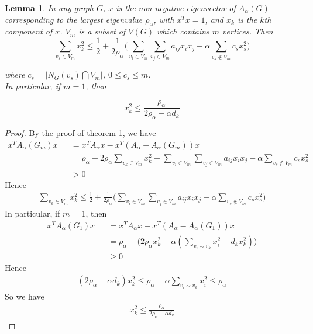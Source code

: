 \documentclass[amsthm]{elsart}
\newtheorem{lemma}{Lemma}[section]
\begin{document}
\begin{lemma}
In any graph $G$, $x$ is the non-negative eigenvector of $A_\alpha (G)$ corresponding to the largest eigenvalue $\rho _\alpha$, with $x^T x = 1$, and $x_k$ is the $k$th component of $x$. $V_m$ is a subset
of $V(G)$ which contains $m$ vertices. Then
\begin{equation} \label{equ:11}
\sum \limits_{v_k \in V_m}^{} x_k^2
\leqslant \frac{1}{2} + \frac{1}{2 \rho_\alpha} \Big( \sum \limits_{v_i \in V_m}^{} \sum \limits_{v_j \in V_m}^{} a_{ij} x_i x_j - \alpha \sum \limits_{v_s \notin V_m}^{} c_s x_s^2 \Big)
\end{equation}

where $ c_s = |N_G(v_s) \bigcap V_m|$,  $0\leqslant c_s \leqslant m$.
\\ In particular, if $m = 1$, then 

\begin{equation} \label{equ:12}
 x_k^2 \leqslant \frac{\rho_\alpha}{2 \rho_\alpha - \alpha d_k}
\end{equation}
\end{lemma}
\begin{proof}
By the proof of theorem 1, we have 
\begin{eqnarray*}
x^T A_\alpha(G_m) x  
&&= x^T A_\alpha x - x^T(A_\alpha - A_\alpha(G_m))x 
\\ &&= \rho_\alpha
   - 2 \rho_\alpha \sum \limits_{v_k \in V_m}^{} x_k^2
   + \sum \limits_{v_i \in V_m}^{} \sum \limits_{v_j \in V_m}^{} a_{ij} x_i x_j
   - \alpha \sum \limits_{v_s \notin V_m}^{} c_s x_s^2
\\ &&> 0
\end{eqnarray*}
Hence 
\begin{eqnarray*}
\sum \limits_{v_k \in V_m}^{} x_k^2
\leqslant \frac{1}{2} + \frac{1}{2 \rho_\alpha} \Big( \sum \limits_{v_i \in V_m}^{} \sum \limits_{v_j \in V_m}^{} a_{ij} x_i x_j - \alpha \sum \limits_{v_s \notin V_m}^{} c_s x_s^2 \Big)
\end{eqnarray*}
In particular, if $m$ = 1, then 
\begin{eqnarray*}
x^T A_\alpha(G_1) x 
&&= x^T A_\alpha x - x^T(A_\alpha - A_\alpha(G_1))x  
\\ &&= \rho_\alpha - \Big( 2 \rho_\alpha x_k^2 + \alpha (\sum \limits_{v_i \sim v_k}^{} x_i^2 - d_k x_k^2 )\Big)
\\ &&\geqslant 0
\end{eqnarray*}
Hence
\begin{eqnarray*}
(2 \rho_\alpha - \alpha d_k ) x_k^2 
\leqslant \rho_\alpha - \alpha \sum \limits_{v_i \sim v_k}^{} x_i^2
\leqslant \rho_\alpha
\end{eqnarray*}
So we have
\begin{eqnarray*}
x_k^2 \leqslant \frac{\rho_\alpha} {2 \rho_\alpha - \alpha d_k} 
\end{eqnarray*}
\end{proof}
\end{document}
